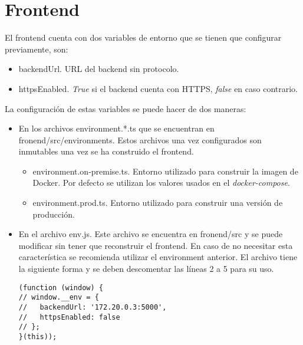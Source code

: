 \section{Frontend}

El frontend cuenta con dos variables de entorno que se tienen que configurar previamente, son:

\begin{itemize}
	\item \textsf{backendUrl}. URL del backend sin protocolo.
	\item \textsf{httpsEnabled}. \textit{True} si el backend cuenta con HTTPS, \textit{false} en caso contrario.
\end{itemize}

La configuración de estas variables se puede hacer de dos maneras:

\begin{itemize}
	\item En los archivos \textsf{environment.*.ts} que se encuentran en \textsf{fronend/src/environments}. Estos archivos una vez configurados son inmutables una vez se ha construido el frontend.

	\begin{itemize}
		\item \textsf{environment.on-premise.ts}. Entorno utilizado para construir la imagen de Docker. Por defecto se utilizan los valores usados en el \textit{docker-compose}.
		\item \textsf{environment.prod.ts}. Entorno utilizado para construir una versión de producción.
	\end{itemize}

	\item En el archivo \textsf{env.js}. Este archivo se encuentra en \textsf{fronend/src} y se puede modificar sin tener que reconstruir el frontend. En caso de no necesitar esta característica se recomienda utilizar el environment anterior. El archivo tiene la siguiente forma y se deben descomentar las líneas 2 a 5 para su uso.
	
\begin{lstlisting}
(function (window) {
// window.__env = {
//   backendUrl: '172.20.0.3:5000',
//   httpsEnabled: false
// };
}(this));
\end{lstlisting}
\end{itemize}
